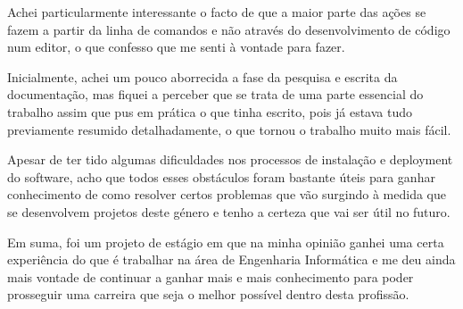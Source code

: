 \documentclass{article}
\begin{document}
Achei particularmente interessante o facto de que a maior parte das ações se fazem a partir da linha de comandos e não através do desenvolvimento de código num editor, o que confesso que me senti à vontade para fazer.

Inicialmente, achei um pouco aborrecida a fase da pesquisa e escrita da documentação, mas fiquei a perceber que se trata de uma parte essencial do trabalho assim que pus em prática o que tinha escrito, pois já estava tudo previamente resumido detalhadamente, o que tornou o trabalho muito mais fácil.

Apesar de ter tido algumas dificuldades nos processos de instalação e deployment do software, acho que todos esses obstáculos foram bastante úteis para ganhar conhecimento de como resolver certos problemas que vão surgindo à medida que se desenvolvem projetos deste género e tenho a certeza que vai ser útil no futuro.

Em suma, foi um projeto de estágio em que na minha opinião ganhei uma certa experiência do que é trabalhar na área de Engenharia Informática e me deu ainda mais vontade de continuar a ganhar mais e mais conhecimento para poder prosseguir uma carreira que seja o melhor possível dentro desta profissão.

\cleardoublepage


\label{referencias}
\end{document}
